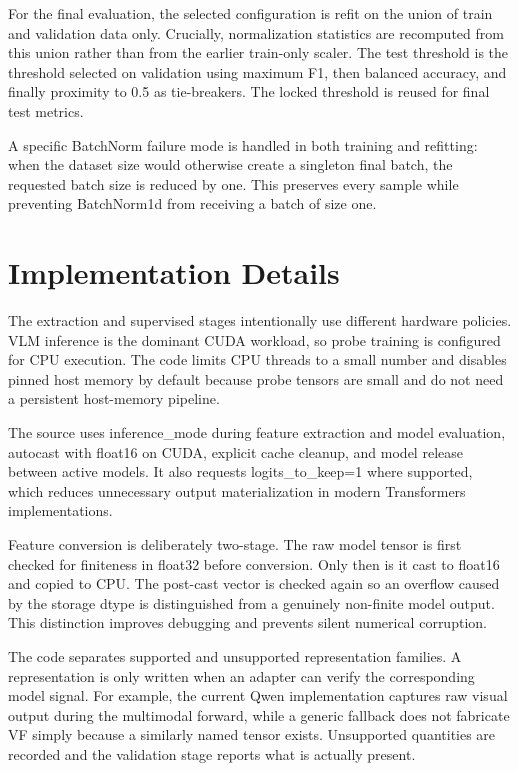 \documentclass[11pt,a4paper]{article}
\begin{document}
For the final evaluation, the selected configuration is refit on the union of train and validation data only. Crucially, normalization statistics are recomputed from this union rather than from the earlier train-only scaler. The test threshold is the threshold selected on validation using maximum F1, then balanced accuracy, and finally proximity to 0.5 as tie-breakers. The locked threshold is reused for final test metrics.

A specific BatchNorm failure mode is handled in both training and refitting: when the dataset size would otherwise create a singleton final batch, the requested batch size is reduced by one. This preserves every sample while preventing BatchNorm1d from receiving a batch of size one.

\section{Implementation Details}

The extraction and supervised stages intentionally use different hardware policies. VLM inference is the dominant CUDA workload, so probe training is configured for CPU execution. The code limits CPU threads to a small number and disables pinned host memory by default because probe tensors are small and do not need a persistent host-memory pipeline.

The source uses inference\_mode during feature extraction and model evaluation, autocast with float16 on CUDA, explicit cache cleanup, and model release between active models. It also requests logits\_to\_keep=1 where supported, which reduces unnecessary output materialization in modern Transformers implementations.

Feature conversion is deliberately two-stage. The raw model tensor is first checked for finiteness in float32 before conversion. Only then is it cast to float16 and copied to CPU. The post-cast vector is checked again so an overflow caused by the storage dtype is distinguished from a genuinely non-finite model output. This distinction improves debugging and prevents silent numerical corruption.

The code separates supported and unsupported representation families. A representation is only written when an adapter can verify the corresponding model signal. For example, the current Qwen implementation captures raw visual output during the multimodal forward, while a generic fallback does not fabricate VF simply because a similarly named tensor exists. Unsupported quantities are recorded and the validation stage reports what is actually present.
\end{document}

